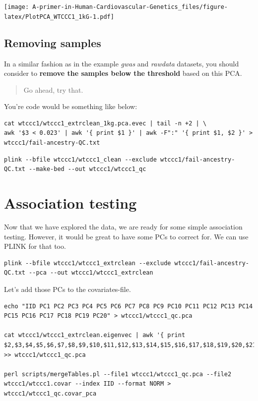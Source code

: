 \documentclass[
]{book}
\begin{document}
\texttt{[image: A-primer-in-Human-Cardiovascular-Genetics\_files/figure-latex/PlotPCA\_WTCCC1\_1kG-1.pdf]}

\hypertarget{removing-samples-1}{%
\subsection{Removing samples}\label{removing-samples-1}}

In a similar fashion as in the example \emph{gwas} and \emph{rawdata} datasets, you should consider to \textbf{remove the samples below the threshold} based on this PCA.

\begin{quote}
Go ahead, try that.
\end{quote}

You're code would be something like below:

\begin{verbatim}
cat wtccc1/wtccc1_extrclean_1kg.pca.evec | tail -n +2 | \
awk '$3 < 0.023' | awk '{ print $1 }' | awk -F":" '{ print $1, $2 }' > wtccc1/fail-ancestry-QC.txt
\end{verbatim}

\begin{verbatim}
plink --bfile wtccc1/wtccc1_clean --exclude wtccc1/fail-ancestry-QC.txt --make-bed --out wtccc1/wtccc1_qc
\end{verbatim}

\hypertarget{association-testing}{%
\section{Association testing}\label{association-testing}}

Now that we have explored the data, we are ready for some simple association testing. However, it would be great to have some PCs to correct for. We can use PLINK for that too.

\begin{verbatim}
plink --bfile wtccc1/wtccc1_extrclean --exclude wtccc1/fail-ancestry-QC.txt --pca --out wtccc1/wtccc1_extrclean
\end{verbatim}

Let's add those PCs to the covariates-file.

\begin{verbatim}
echo "IID PC1 PC2 PC3 PC4 PC5 PC6 PC7 PC8 PC9 PC10 PC11 PC12 PC13 PC14 PC15 PC16 PC17 PC18 PC19 PC20" > wtccc1/wtccc1_qc.pca

cat wtccc1/wtccc1_extrclean.eigenvec | awk '{ print $2,$3,$4,$5,$6,$7,$8,$9,$10,$11,$12,$13,$14,$15,$16,$17,$18,$19,$20,$21,$22}' >> wtccc1/wtccc1_qc.pca

perl scripts/mergeTables.pl --file1 wtccc1/wtccc1_qc.pca --file2 wtccc1/wtccc1.covar --index IID --format NORM > wtccc1/wtccc1_qc.covar_pca
\end{verbatim}
\end{document}

